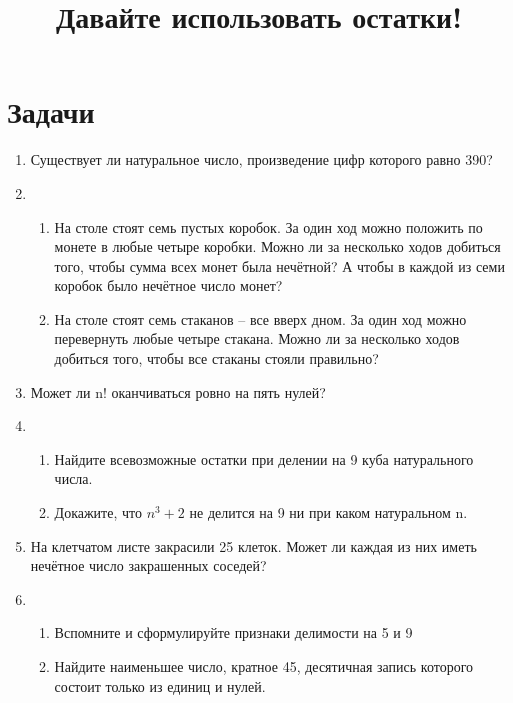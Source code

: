 \documentclass[a4paper,12pt]{article}
\title{Давайте использовать остатки!}
\begin{document}
\maketitle

\section*{Задачи}

\begin{enumerate}[label=\textbf{\arabic*.}]
    \item Существует ли натуральное число, произведение цифр которого равно 390?
    \item \begin{enumerate}
        \item На столе стоят семь пустых коробок. За один ход можно положить по монете в любые четыре коробки. Можно ли за несколько ходов добиться того, чтобы сумма всех монет была нечётной? А чтобы в каждой из семи коробок было нечётное число монет?
        \item На столе стоят семь стаканов – все вверх дном. За один ход можно перевернуть любые четыре стакана. Можно ли за несколько ходов добиться того, чтобы все стаканы стояли правильно?
    \end{enumerate}
    \item Может ли n! оканчиваться ровно на пять нулей?
    \item \begin{enumerate}
        \item Найдите всевозможные остатки при делении на 9 куба натурального числа.
        \item Докажите, что $n^3+2$ не делится на 9 ни при каком натуральном n.
    \end{enumerate}
    \item На клетчатом листе закрасили 25 клеток. Может ли каждая из них иметь нечётное число закрашенных соседей?
    \item \begin{enumerate}
        \item Вспомните и сформулируйте признаки делимости на 5 и 9
        \item Найдите наименьшее число, кратное 45, десятичная запись которого состоит только из единиц и нулей.
    \end{enumerate}
    
\end{enumerate}
\end{document}
